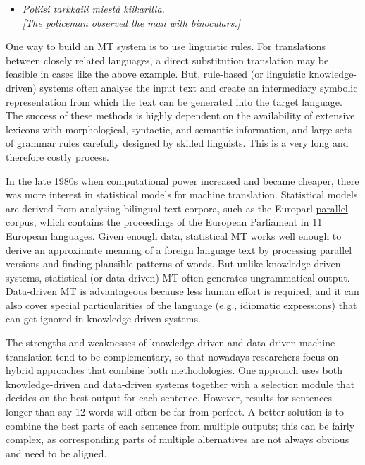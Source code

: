 \documentclass[]{../../metanetpaper}
\begin{document}
\begin{Parallel}[c]{70mm}{70mm}
{\begin{itemize}
\item[] {\foreignlanguage{finnish}{\textit{Poliisi tarkkaili miestä
                kiikarilla.}}} \\
        \textit{[The policeman observed the man with binoculars.]}
\end{itemize}
One way to build an MT system is to use linguistic rules. For translations
between closely related languages, a direct substitution translation may be
feasible in cases like the above example. But, rule-based (or linguistic
knowledge-driven) systems often analyse the input text and create an
intermediary symbolic representation from which the text can be generated into
the target language. The success of these methods is highly dependent on the
availability of extensive lexicons with morphological, syntactic, and semantic
information, and large sets of grammar rules carefully designed by skilled
linguists. This is a very long and therefore costly process.

In the late 1980s when computational power increased and became cheaper, there
was more interest in statistical models for machine translation. Statistical
models are derived from analysing bilingual text corpora, such as the Europarl
\underline{parallel corpus}, which contains the proceedings of the European Parliament in
11 European languages. Given enough data, statistical MT works well enough to
derive an approximate meaning of a foreign language text by processing parallel
versions and finding plausible patterns of words. But unlike knowledge-driven
systems, statistical (or data-driven) MT often generates ungrammatical output.
Data-driven MT is advantageous because less human effort is required, and it
can also cover special particularities of the language (e.g., idiomatic
expressions) that can get ignored in knowledge-driven systems.




The strengths and weaknesses of knowledge-driven and data-driven machine
translation tend to be complementary, so that nowadays researchers focus on
hybrid approaches that combine both methodologies. One approach uses both
knowledge-driven and data-driven systems together with a selection module that
decides on the best output for each sentence. However, results for sentences
longer than say 12 words will often be far from perfect. A better solution is
to combine the best parts of each sentence from multiple outputs; this can be
fairly complex, as corresponding parts of multiple alternatives are not always
obvious and need to be aligned.

}
\end{Parallel}
\end{document}
